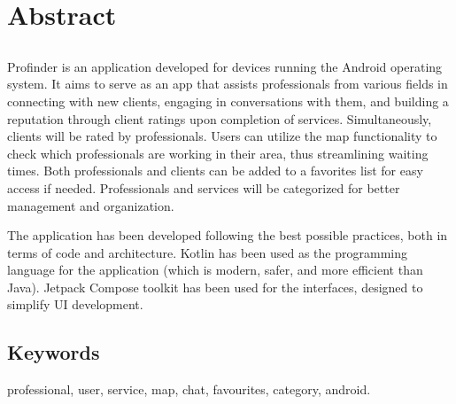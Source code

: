 \chapter*{Abstract}

\section*{\tituloPortadaEngVal}

Profinder is an application developed for devices running the Android operating system. It aims to serve as an app that assists professionals from various fields in connecting with new clients, engaging in conversations with them, and building a reputation through client ratings upon completion of services. Simultaneously, clients will be rated by professionals. Users can utilize the map functionality to check which professionals are working in their area, thus streamlining waiting times. Both professionals and clients can be added to a favorites list for easy access if needed. Professionals and services will be categorized for better management and organization.

The application has been developed following the best possible practices, both in terms of code and architecture. Kotlin has been used as the programming language for the application (which is modern, safer, and more efficient than Java). Jetpack Compose toolkit has been used for the interfaces, designed to simplify UI development.


\section*{Keywords}
\noindent professional, user, service, map, chat, favourites, category, android.



